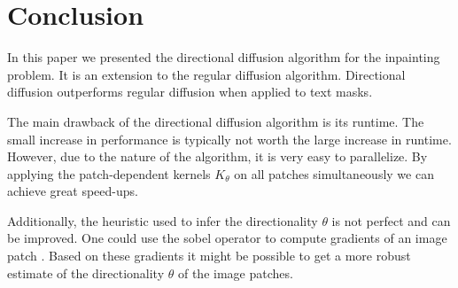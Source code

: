 \section{Conclusion}
\label{sec:conclusion}

In this paper we presented the directional diffusion algorithm for the inpainting problem. It is an extension to the regular diffusion algorithm. Directional diffusion outperforms regular diffusion when applied to text masks.

The main drawback of the directional diffusion algorithm is its runtime. The small increase in performance is typically not worth the large increase in runtime. However, due to the nature of the algorithm, it is very easy to parallelize. By applying the patch-dependent kernels $K_\theta$ on all patches simultaneously we can achieve great speed-ups.

Additionally, the heuristic used to infer the directionality $\theta$ is not perfect and can be improved. One could use the sobel operator to compute gradients of an image patch \cite{sobel2014history}. Based on these gradients it might be possible to get a more robust estimate of the directionality $\theta$ of the image patches. 

